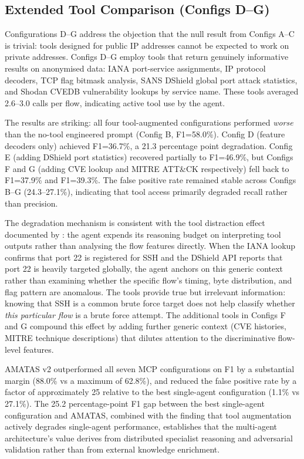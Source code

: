 \documentclass[../main.tex]{subfiles}
\begin{document}
\subsection{Extended Tool Comparison (Configs D--G)}
\label{sec:extended-mcp}

Configurations D--G address the objection that the null result from Configs A--C is trivial: tools designed for public IP addresses cannot be expected to work on private addresses. Configs D--G employ tools that return genuinely informative results on anonymised data: IANA port-service assignments, IP protocol decoders, TCP flag bitmask analysis, SANS DShield global port attack statistics, and Shodan CVEDB vulnerability lookups by service name. These tools averaged 2.6--3.0 calls per flow, indicating active tool use by the agent.

The results are striking: all four tool-augmented configurations performed \textit{worse} than the no-tool engineered prompt (Config B, F1=58.0\%). Config D (feature decoders only) achieved F1=36.7\%, a 21.3 percentage point degradation. Config E (adding DShield port statistics) recovered partially to F1=46.9\%, but Configs F and G (adding CVE lookup and MITRE ATT\&CK respectively) fell back to F1=37.9\% and F1=39.3\%. The false positive rate remained stable across Configs B--G (24.3--27.1\%), indicating that tool access primarily degraded recall rather than precision.

The degradation mechanism is consistent with the tool distraction effect documented by \textcite{Yao2023}: the agent expends its reasoning budget on interpreting tool outputs rather than analysing the flow features directly. When the IANA lookup confirms that port 22 is registered for SSH and the DShield API reports that port 22 is heavily targeted globally, the agent anchors on this generic context rather than examining whether the specific flow's timing, byte distribution, and flag pattern are anomalous. The tools provide true but irrelevant information: knowing that SSH is a common brute force target does not help classify whether \textit{this particular flow} is a brute force attempt. The additional tools in Configs F and G compound this effect by adding further generic context (CVE histories, MITRE technique descriptions) that dilutes attention to the discriminative flow-level features.

AMATAS v2 outperformed all seven MCP configurations on F1 by a substantial margin (88.0\% vs a maximum of 62.8\%), and reduced the false positive rate by a factor of approximately 25 relative to the best single-agent configuration (1.1\% vs 27.1\%). The 25.2 percentage-point F1 gap between the best single-agent configuration and AMATAS, combined with the finding that tool augmentation actively degrades single-agent performance, establishes that the multi-agent architecture's value derives from distributed specialist reasoning and adversarial validation rather than from external knowledge enrichment.
\end{document}
